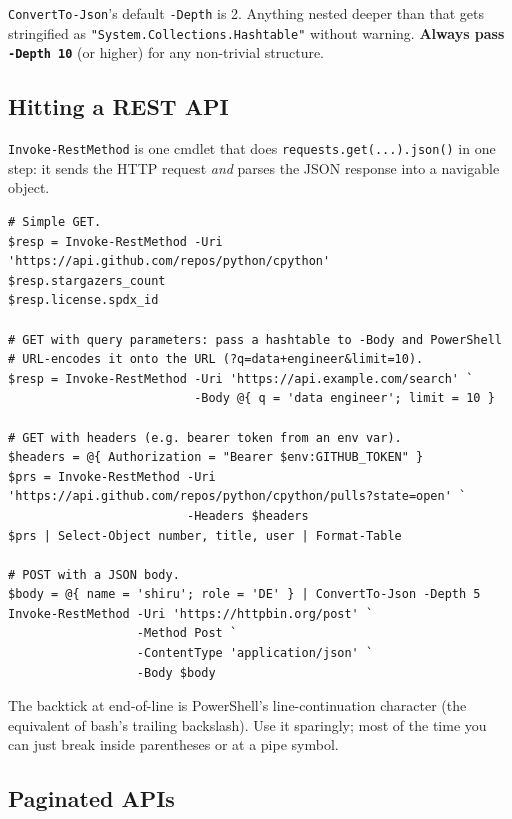 \documentclass[11pt,a4paper]{article}
\newcommand{\cmd}[1]{\texttt{\textcolor{pwshKw}{#1}}}
\begin{document}
\begin{gotcha}
\cmd{ConvertTo-Json}'s default \texttt{-Depth} is 2. Anything nested
deeper than that gets stringified as \texttt{"System.Collections.Hashtable"}
without warning. \textbf{Always pass \texttt{-Depth 10}} (or higher)
for any non-trivial structure.
\end{gotcha}

\subsection*{Hitting a REST API}

\cmd{Invoke-RestMethod} is one cmdlet that does
\texttt{requests.get(...).json()} in one step: it sends the HTTP
request \emph{and} parses the JSON response into a navigable object.

\begin{lstlisting}[style=pwshstyle]
# Simple GET.
$resp = Invoke-RestMethod -Uri 'https://api.github.com/repos/python/cpython'
$resp.stargazers_count
$resp.license.spdx_id

# GET with query parameters: pass a hashtable to -Body and PowerShell
# URL-encodes it onto the URL (?q=data+engineer&limit=10).
$resp = Invoke-RestMethod -Uri 'https://api.example.com/search' `
                          -Body @{ q = 'data engineer'; limit = 10 }

# GET with headers (e.g. bearer token from an env var).
$headers = @{ Authorization = "Bearer $env:GITHUB_TOKEN" }
$prs = Invoke-RestMethod -Uri 'https://api.github.com/repos/python/cpython/pulls?state=open' `
                         -Headers $headers
$prs | Select-Object number, title, user | Format-Table

# POST with a JSON body.
$body = @{ name = 'shiru'; role = 'DE' } | ConvertTo-Json -Depth 5
Invoke-RestMethod -Uri 'https://httpbin.org/post' `
                  -Method Post `
                  -ContentType 'application/json' `
                  -Body $body
\end{lstlisting}

The backtick at end-of-line is PowerShell's line-continuation
character (the equivalent of bash's trailing backslash). Use it
sparingly; most of the time you can just break inside parentheses
or at a pipe symbol.

\subsection*{Paginated APIs}
\end{document}

